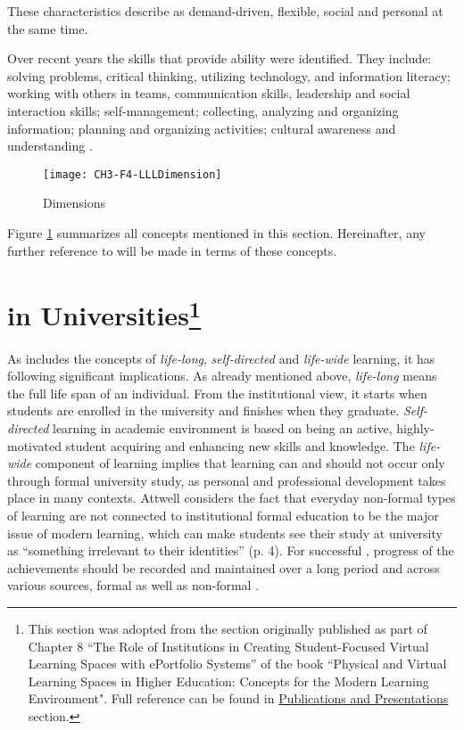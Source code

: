 These characteristics describe \LLLs as demand-driven, flexible, social and
personal at the same time. 

Over recent years the skills that provide \LLLs ability were identified. They
include: solving problems, critical thinking, utilizing technology, and
information literacy; working with others in teams, communication skills,
leadership and social interaction skills; self-management; collecting, analyzing
and organizing information; planning and organizing activities; cultural
awareness and understanding
\citep{Brooks2008,Heinrich2007,Otala1997,Pitman2009}. 

\begin{figure}[htb]
\centering
\texttt{[image: CH3-F4-LLLDimension]}
\caption{\LLLc Dimensions}
\label{fig:llldim}
\end{figure}

Figure \ref{fig:llldim} summarizes all concepts mentioned in this section.
Hereinafter, any further reference to \LLLs will be made in terms of these
concepts.

\section[\LLLc in Universities]{\LLLc in Universities\footnote{This section was
adopted from the section originally published as part of Chapter 8 ``The Role of
Institutions in Creating Student-Focused Virtual Learning Spaces with ePortfolio
Systems'' of the book ``Physical and Virtual Learning Spaces in Higher
Education: Concepts for the Modern Learning Environment". Full reference can be
found in \hyperref[sec:pub]{Publications and Presentations} section.} }

\label{sec:uni}

As \LLLs includes the concepts of \textit{life-long}, \textit{self-directed}
and \textit{life-wide} learning, it has following significant implications. As
already mentioned above, \textit{life-long} means the full life span of an
individual. From the institutional view, it starts when students are enrolled in
the university and finishes when they graduate. \textit{Self-directed} learning
in academic environment is based on being an active, highly-motivated student
acquiring and enhancing new skills and knowledge. The \textit{life-wide}
component of learning implies that learning can and should not occur only
through formal university study, as personal and professional development takes
place in many contexts. Attwell \citeyearpar{Attwell2007} considers the fact
that everyday non-formal types of learning are not connected to institutional
formal education to be the major issue of modern learning, which can make
students see their study at university as ``something irrelevant to their
identities'' (p. 4). For successful \LLLsn, progress of the achievements should
be recorded and maintained over a long period and across various sources, formal
as well as non-formal \citep{Kay2008}.

